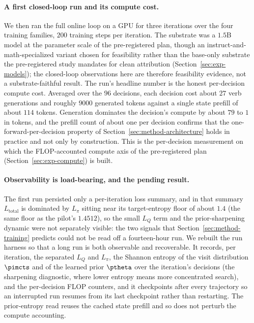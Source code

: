 \paragraph{A first closed-loop run and its compute cost.}
We then ran the full online loop on a GPU for three iterations over the four
training families, $200$ training steps per iteration. The substrate was a
$1.5$B model at the parameter scale of the pre-registered plan, though an
instruct-and-math-specialized variant chosen for feasibility rather than the
base-only substrate the pre-registered study mandates for clean attribution
(Section~\ref{sec:exp-models}); the closed-loop observations here are therefore
feasibility evidence, not a substrate-faithful result. The run's headline
number is the honest per-decision compute cost. Averaged over the $96$
decisions, each decision cost about $27$ verb generations and roughly $9000$
generated tokens against a single state prefill of about $114$ tokens.
Generation dominates the decision's compute by about $79$ to $1$ in tokens, and
the prefill count of about one per decision confirms that the
one-forward-per-decision property of Section~\ref{sec:method-architecture}
holds in practice and not only by construction. This is the per-decision
measurement on which the FLOP-accounted compute axis of the pre-registered plan
(Section~\ref{sec:exp-compute}) is built.

\paragraph{Observability is load-bearing, and the pending result.}
The first run persisted only a per-iteration loss summary, and in that summary
$L_{\mathrm{total}}$ is dominated by $L_{\pi}$ sitting near its target-entropy
floor of about $1.4$ (the same floor as the pilot's $1.4512$), so the small
$L_Q$ term and the prior-sharpening dynamic were not separately visible: the
two signals that Section~\ref{sec:method-training} predicts could not be read
off a fourteen-hour run. We rebuilt the run harness so that a long run is both
observable and recoverable. It records, per iteration, the separated $L_Q$ and
$L_{\pi}$, the Shannon entropy of the visit distribution $\pimcts$ and of the
learned prior $\ptheta$ over the iteration's decisions (the sharpening
diagnostic, where lower entropy means more concentrated search), and the
per-decision FLOP counters, and it checkpoints after every trajectory so an
interrupted run resumes from its last checkpoint rather than restarting. The
prior-entropy read reuses the cached state prefill and so does not perturb the
compute accounting.

